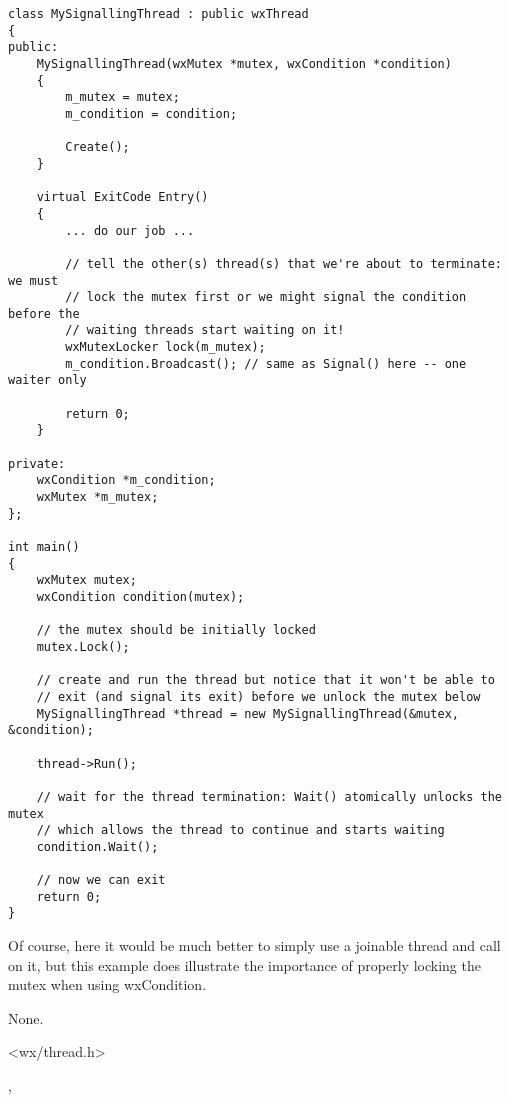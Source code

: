 \begin{verbatim}
class MySignallingThread : public wxThread
{
public:
    MySignallingThread(wxMutex *mutex, wxCondition *condition)
    {
        m_mutex = mutex;
        m_condition = condition;

        Create();
    }

    virtual ExitCode Entry()
    {
        ... do our job ...

        // tell the other(s) thread(s) that we're about to terminate: we must
        // lock the mutex first or we might signal the condition before the
        // waiting threads start waiting on it!
        wxMutexLocker lock(m_mutex);
        m_condition.Broadcast(); // same as Signal() here -- one waiter only

        return 0;
    }

private:
    wxCondition *m_condition;
    wxMutex *m_mutex;
};

int main()
{
    wxMutex mutex;
    wxCondition condition(mutex);

    // the mutex should be initially locked
    mutex.Lock();

    // create and run the thread but notice that it won't be able to
    // exit (and signal its exit) before we unlock the mutex below
    MySignallingThread *thread = new MySignallingThread(&mutex, &condition);

    thread->Run();

    // wait for the thread termination: Wait() atomically unlocks the mutex
    // which allows the thread to continue and starts waiting
    condition.Wait();

    // now we can exit
    return 0;
}
\end{verbatim}

Of course, here it would be much better to simply use a joinable thread and
call  on it, but this example does
illustrate the importance of properly locking the mutex when using
wxCondition.


None.


<wx/thread.h>


, 


\label{wxconditionconstr}

